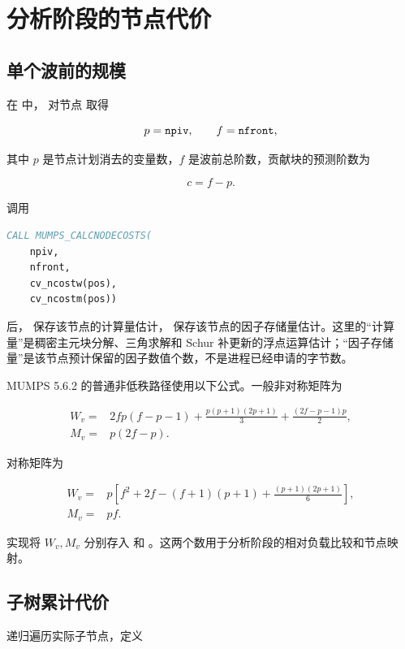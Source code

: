 \section{分析阶段的节点代价}

\subsection{单个波前的规模}

在  中， 对节点  取得

\[
p=\texttt{npiv},\qquad f=\texttt{nfront},
\]

其中 $p$ 是节点计划消去的变量数，$f$ 是波前总阶数，贡献块的预测阶数为

\[
c=f-p.
\]

调用

\begin{lstlisting}[language=Fortran]
CALL MUMPS_CALCNODECOSTS(
    npiv,
    nfront,
    cv_ncostw(pos),
    cv_ncostm(pos))
\end{lstlisting}

后， 保存该节点的计算量估计， 保存该节点的因子存储量估计。这里的“计算量”是稠密主元块分解、三角求解和 Schur 补更新的浮点运算估计；“因子存储量”是该节点预计保留的因子数值个数，不是进程已经申请的字节数。

MUMPS 5.6.2 的普通非低秩路径使用以下公式。一般非对称矩阵为

\[
\begin{aligned}
W_v={}&2fp(f-p-1)
+\frac{p(p+1)(2p+1)}{3}
+\frac{(2f-p-1)p}{2},\\
M_v={}&p(2f-p).
\end{aligned}
\]

对称矩阵为

\[
\begin{aligned}
W_v={}&p\left[
f^2+2f-(f+1)(p+1)
+\frac{(p+1)(2p+1)}{6}
\right],\\
M_v={}&pf.
\end{aligned}
\]

实现将 $W_v,M_v$ 分别存入  和 。这两个数用于分析阶段的相对负载比较和节点映射\cite{mumpssource}。

\subsection{子树累计代价}

 递归遍历实际子节点，定义

